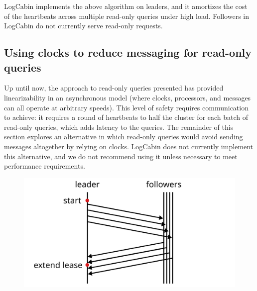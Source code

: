 LogCabin implements the above algorithm on leaders, and it amortizes the
cost of the heartbeats across multiple read-only queries under high
load. Followers in LogCabin do not currently serve read-only requests.

\subsection{Using clocks to reduce messaging for read-only queries}



Up until now, the approach to read-only queries presented has provided
linearizability in an asynchronous model (where clocks, processors, and
messages can all operate at arbitrary speeds). This level of safety
requires communication to achieve: it requires a round of heartbeats to
half the cluster for each batch of read-only queries, which adds
latency to the queries.
The remainder of this section explores an alternative in which read-only
queries would avoid sending messages altogether by relying on clocks.
LogCabin does not currently implement this alternative, and we do not
recommend using it unless necessary to meet performance requirements.

\begin{figure}
\centering
\includegraphics[scale=0.45]{clients/leases}
\label{fig:clients:leases}
\end{figure}

